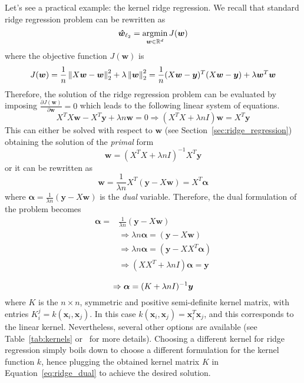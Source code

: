 			Let's see a practical example: the kernel ridge regression. We recall that standard ridge regression problem can be rewritten as
			$$
			\bm{\hat w}_{\ell_2} = \mathop{\mathrm{argmin}}\limits_{\bm{w} \in \mathbb{R}^d} J(\bm{w})
			$$
			where the objective function $J(\bm{w})$ is
			$$
			J(\bm{w}) = \frac{1}{n}\left\lVert X\bm{w}-\bm{w}\right\rVert_2^2+\lambda\left\lVert\bm{w}\right\rVert_2^2 = \frac{1}{n}(X\bm{w}-\bm{y})^T(X\bm{w}-\bm{y})+\lambda\bm{w}^T\bm{w}
			$$
			Therefore, the solution of the ridge regression problem can be evaluated by imposing $\frac{\partial J(\bm{w})}{\partial \bm{w}}=0$ which leads to the following linear system of equations.
			$$
			X^TX\bm{w}-X^T\bm{y}+\lambda n \bm{w}=0 \Rightarrow (X^TX+\lambda n I)\bm{w} = X^T\bm{y}
			$$
			This can either be solved with respect to $\bm{w}$ (see Section~\ref{sec:ridge_regression}) obtaining the solution of the \textit{primal} form
			\begin{equation} \label{eq:ridge_backup}
				\bm{w} = (X^TX+\lambda n I)^{-1}X^T\bm{y}
		  \end{equation}
			or it can be rewritten as
			$$
			\bm{w} = \frac{1}{\lambda n} X^T(\bm{y}-X\bm{w}) = X^T\bm{\alpha}
			$$
			where $\bm{\alpha} = \frac{1}{\lambda n}(\bm{y} - X\bm{w})$ is the \textit{dual} variable. Therefore, the dual formulation of the problem becomes
			$$
				\begin{aligned}
					\bm{\alpha} = {} & \frac{1}{\lambda n}(\bm{y} - X\bm{w}) \\
						{} & \Rightarrow \lambda n \bm{\alpha} = (\bm{y} - X\bm{w})\\
						{} & \Rightarrow \lambda n \bm{\alpha} = (\bm{y} - XX^T\bm{\alpha})\\
						{} & \Rightarrow (XX^T + \lambda n I) \bm{\alpha} = \bm{y}\\
				\end{aligned}
			$$
			\begin{equation} \label{eq:ridge_dual}
				\Rightarrow \bm{\alpha} = (K + \lambda n I)^{-1}\bm{y} \\
			\end{equation}
			where $K$ is the $n \times n$, symmetric and positive semi-definite kernel matrix, with entries $K_i^j = k(\bm{x}_i, \bm{x}_j)$. In this case $k(\bm{x}_i, \bm{x}_j) = \bm{x}_i^T\bm{x}_j$, and this corresponds to the linear kernel. Nevertheless, several other options are available (see Table~\ref{tab:kernels} or~\cite{bishop2006pattern} for more details). Choosing a different kernel for ridge regression simply boils down to choose a different formulation for the kernel function $k$, hence plugging the obtained kernel matrix $K$ in Equation~\eqref{eq:ridge_dual} to achieve the desired solution.

